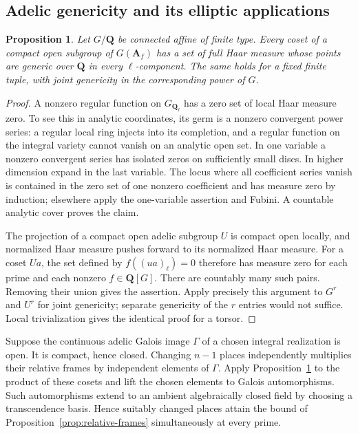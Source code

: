 \documentclass[11pt]{article}
\newtheorem{proposition}[theorem]{Proposition}
\theoremstyle{definition}\newtheorem{definition}[theorem]{Definition}
\theoremstyle{remark}\newtheorem{remark}[theorem]{Remark}
\newcommand{\Q}{\mathbf Q}\newcommand{\Z}{\mathbf Z}
\begin{document}
\subsection{Adelic genericity and its elliptic applications}
\begin{proposition}\label{prop:adelic-generic}
Let $G/\Q$ be connected affine of finite type. Every coset of a compact open subgroup of $G(\mathbf A_f)$ has a set of full Haar measure whose points are generic over $\Q$ in every $\ell$-component. The same holds for a fixed finite tuple, with joint genericity in the corresponding power of $G$.
\end{proposition}
\begin{proof}
A nonzero regular function on $G_{\Q_\ell}$ has a zero set of local Haar measure zero. To see this in analytic coordinates, its germ is a nonzero convergent power series: a regular local ring injects into its completion, and a regular function on the integral variety cannot vanish on an analytic open set. In one variable a nonzero convergent series has isolated zeros on sufficiently small discs. In higher dimension expand in the last variable. The locus where all coefficient series vanish is contained in the zero set of one nonzero coefficient and has measure zero by induction; elsewhere apply the one-variable assertion and Fubini. A countable analytic cover proves the claim.

The projection of a compact open adelic subgroup $U$ is compact open locally, and normalized Haar measure pushes forward to its normalized Haar measure. For a coset $Ua$, the set defined by $f((ua)_\ell)=0$ therefore has measure zero for each prime and each nonzero $f\in\Q[G]$. There are countably many such pairs. Removing their union gives the assertion. Apply precisely this argument to $G^r$ and $U^r$ for joint genericity; separate genericity of the $r$ entries would not suffice. Local trivialization gives the identical proof for a torsor.
\end{proof}

Suppose the continuous adelic Galois image $\Gamma$ of a chosen integral realization is open. It is compact, hence closed. Changing $n-1$ places independently multiplies their relative frames by independent elements of $\Gamma$. Apply Proposition~\ref{prop:adelic-generic} to the product of these cosets and lift the chosen elements to Galois automorphisms. Such automorphisms extend to an ambient algebraically closed field by choosing a transcendence basis. Hence suitably changed places attain the bound of Proposition~\ref{prop:relative-frames} simultaneously at every prime.
\end{document}

